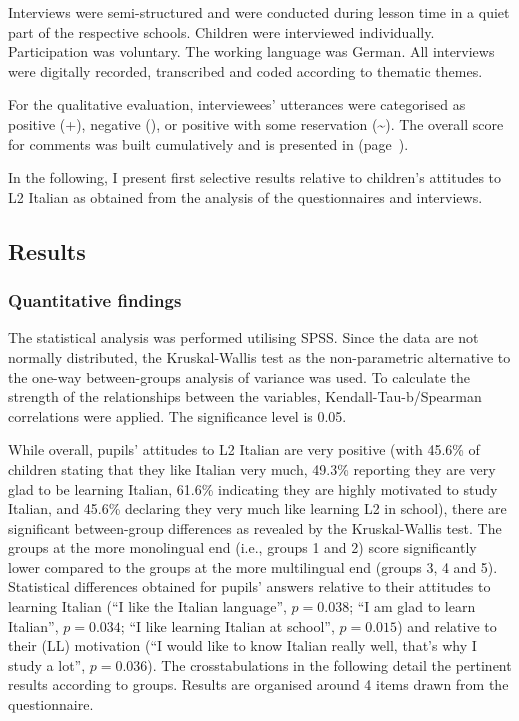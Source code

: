 \documentclass[output=paper]{../langscibook}
\begin{document}


\largerpage
Interviews were semi-structured and were conducted during lesson time in a quiet part of the respective schools. Children were interviewed individually. Participation was voluntary. The working language was German. All interviews were digitally recorded, transcribed and coded according to thematic themes. 

For the qualitative evaluation, interviewees’ utterances were categorised as positive (+), negative (\textminus), or positive with some reservation ({\textasciitilde}). The overall score for comments was built cumulatively and is presented in  (page~\pageref{tab:7:5}). 

In the following, I present first selective results relative to children’s attitudes to L2 Italian as obtained from the analysis of the questionnaires and interviews.

\largerpage
\subsection{Results}\label{sec:hofer:6.5}
\subsubsection{Quantitative findings}


The statistical analysis was performed utilising SPSS. Since the data are not normally distributed, the Kruskal-Wallis test as the non-parametric alternative to the one-way between-groups analysis of variance was used. To calculate the strength of the relationships between the variables, Kendall-Tau-b\slash Spearman correlations were applied. The significance level is 0.05.

While overall, pupils’ attitudes to L2 Italian are very positive (with 45.6\% of children stating that they like Italian very much, 49.3\% reporting they are very glad to be learning Italian, 61.6\% indicating they are highly motivated to study Italian, and 45.6\% declaring they very much like learning L2 in school), there are significant between-group differences as revealed by the Kruskal-Wallis test. The groups at the more monolingual end (i.e., groups 1 and 2) score significantly lower compared to the groups at the more multilingual end (groups 3, 4 and 5). Statistical differences obtained for pupils’ answers relative to their attitudes to learning Italian (“I like the Italian language”, $p = 0.038$; “I am glad to learn Italian”, $p = 0.034$; “I like learning Italian at school”, $p = 0.015$) and relative to their (LL) motivation (“I would like to know Italian really well, that's why I study a lot”, $p = 0.036$). The crosstabulations in the following detail the pertinent results according to groups. Results are organised around 4 items drawn from the questionnaire.
\end{document}
